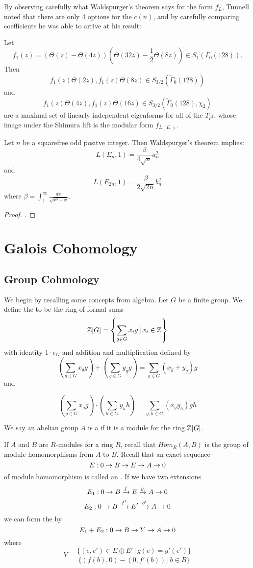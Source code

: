 \documentclass[12pt, a4paper]{report}
\begin{document}
By observing carefully what Waldspurger's theorem
says for the form $f_L$, Tunnell noted that
there are only 4 options for the $c(n)$, and by carefully comparing coefficients
he was able to arrive at his result:

\begin{thm}
  Let
  \[f_1(z) = (\Theta(z)-\Theta(4z))(\Theta(32z) - \frac{1}{2}\Theta(8z))
    \in S_1(\Gamma_0(128)).\]
  Then
  \[f_1(z)\Theta(2z), f_1(z)\Theta(8z) \in S_{3/2}(\tilde{\Gamma}_0(128)) \]
  and
  \[ f_1(z)\Theta(4z), f_1(z) \Theta(16z) \in
    S_{3/2}(\tilde{\Gamma}_0(128), \chi_2)\]
  are a maximal set of linearly independent eigenforms for all of the $T_{p^2}$,
  whose image under the Shimura lift is the modular form $f_{L(E_1)}$.

  Let $n$ be a squarefree odd positve integer. Then Waldspurger's theorem implies:
  \[L(E_n,1) = \frac{\beta}{4\sqrt{n}} a_n^2 \]
  and
  \[L(E_{2n},1) = \frac{\beta}{2 \sqrt{2n}} b_n^2 \]
  where $\beta = \int_1^\infty \frac{dx}{\sqrt{x^3-x}}.$
\end{thm}
\begin{proof}
  \cite[See][Theorem 3, Page 328-329]{Tunnell}.
\end{proof}

\newpage

\chapter{Galois Cohomology}

\section{Group Cohmology}

We begin by recalling some concepts from algebra.
Let $G$ be a finite group. We define the  to
be the ring of formal sums
\[ {\mathbb Z}[G] = \left\{ \sum\limits_{g \in G} x_i g \, | \, x_i \in {\mathbb Z}  \right\} \]
with identity $1 \cdot e_G$ and addition and multiplication defined by
\[\left( \sum\limits_{g \in G} x_g g \right) + \left( \sum\limits_{g \in G} y_g
    g \right)
= \sum\limits_{g \in G} (x_g+y_g)g\]
and

\[\left( \sum\limits_{g \in G} x_g g \right) \cdot \left( \sum\limits_{h \in G} y_h
    h \right)
= \sum\limits_{g, h \in G} (x_gy_h)gh\]

We say an abelian group $A$ is a  if it is a module
for the ring ${\mathbb Z}[G]$. 

If $A$ and $B$ are $R$-modules for a ring $R$, recall that
$Hom_R(A,B)$ is the group of module homomorphisms from $A$ to $B$.
Recall that an exact sequence
\[E: 0 \rightarrow B \rightarrow E \rightarrow A \rightarrow 0\]
of module homomorphism is called an . If we have
two extensions
\[E_1: 0 \rightarrow B \xrightarrow[]{f} E \xrightarrow[]{g} A \rightarrow 0\]
\[E_2: 0 \rightarrow B \xrightarrow[]{f'} E' \xrightarrow[]{g'} A \rightarrow 0\]
we can form the  by
\[E_1 + E_2 : 0 \rightarrow B \rightarrow Y \rightarrow A \rightarrow 0\]
where
\[Y = \frac{\{(e,e') \in E \oplus E' \, | \, g(e) = g'(e')\}}{\{
    (f(b),0) - (0, f'(b)) \, | \, b \in B\}}\]
\end{document}
